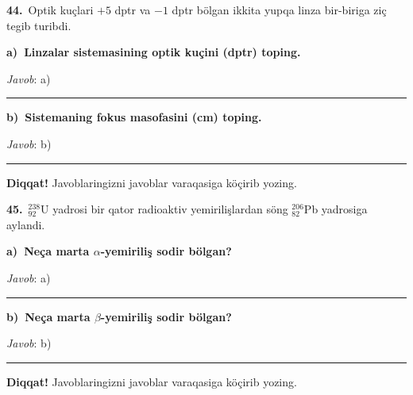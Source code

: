 \documentclass[11pt,a4paper]{article}
\newcommand{\blank}{\rule{5cm}{0.4pt}}
\begin{document}
\noindent\textbf{44.}\ Optik kuçlari $+5$ dptr va $-1$ dptr bölgan ikkita yupqa linza bir-biriga ziç tegib turibdi.\par\smallskip
\medskip\noindent\textbf{a)\ Linzalar sistemasining optik kuçini (dptr) toping.}\par
\noindent\textit{Javob}: a)\ \blank\par
\medskip\noindent\textbf{b)\ Sistemaning fokus masofasini (cm) toping.}\par
\noindent\textit{Javob}: b)\ \blank\par
\medskip\noindent\textbf{Diqqat!} Javoblaringizni javoblar varaqasiga köçirib yozing.\par\vspace{10pt}
\noindent\textbf{45.}\ $^{238}_{92}$U yadrosi bir qator radioaktiv yemirilişlardan söng $^{206}_{82}$Pb yadrosiga aylandi.\par\smallskip
\medskip\noindent\textbf{a)\ Neça marta $\alpha$-yemiriliş sodir bölgan?}\par
\noindent\textit{Javob}: a)\ \blank\par
\medskip\noindent\textbf{b)\ Neça marta $\beta$-yemiriliş sodir bölgan?}\par
\noindent\textit{Javob}: b)\ \blank\par
\medskip\noindent\textbf{Diqqat!} Javoblaringizni javoblar varaqasiga köçirib yozing.\par\vspace{10pt}
\end{document}
